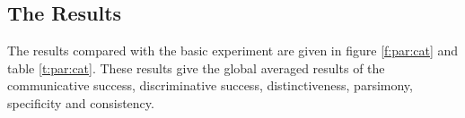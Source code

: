 \subsection{The Results}

The results compared with the basic experiment are given in figure \ref{f:par:cat} and table \ref{t:par:cat}. These results give the global averaged results of the communicative success, discriminative success, distinctiveness, parsimony, specificity and consistency.

\begin{figure}
\centering
{}
\\
\\

\end{figure}
